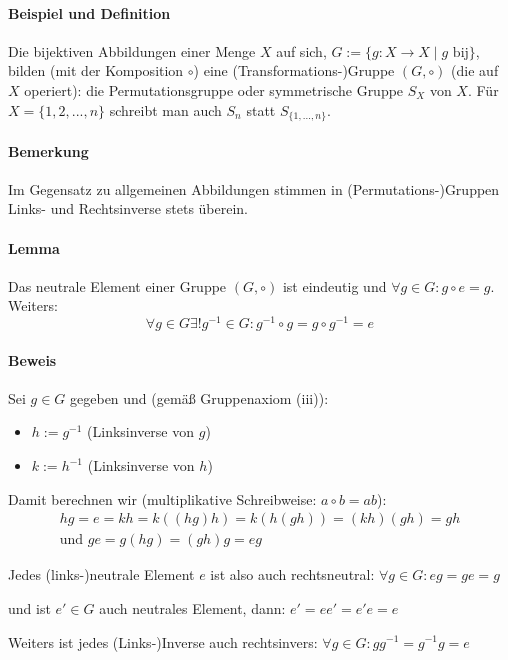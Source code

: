 \paragraph{Beispiel und Definition}
	Die bijektiven Abbildungen einer Menge $X$ auf sich, $G:= \{g:X\to X\mid g \text{ bij}\}$, bilden (mit der Komposition $\circ$) eine (Transformations-)Gruppe $(G,\circ )$ (die auf $X$ operiert): die Permutationsgruppe oder symmetrische Gruppe $S_X$ von $X$. Für $X=\{1,2,...,n\}$ schreibt man auch $S_n$ statt $S_{\{1,...,n\}}$.
\paragraph{Bemerkung}
	Im Gegensatz zu allgemeinen Abbildungen stimmen in (Permutations-)Gruppen Links- und Rechtsinverse stets überein.
\paragraph{Lemma}
	Das neutrale Element einer Gruppe $(G,\circ )$ ist eindeutig und $\forall g\in G: g\circ e = g$. Weiters: 
	\begin{equation*}
		\forall g\in G \exists ! g^{-1} \in G: g^{-1}\circ g = g \circ g^{-1} = e
	\end{equation*}

\paragraph{Beweis}
	Sei $g\in G$ gegeben und (gemäß Gruppenaxiom (iii)):
	\begin{itemize}
		\item $h:= g^{-1}$ (Linksinverse von $g$)
		\item $k:= h^{-1}$ (Linksinverse von $h$)
	\end{itemize}
	
	Damit berechnen wir (multiplikative Schreibweise: $a\circ b = ab$):
	\begin{gather*}
		hg = e = kh = k((hg)h) = k(h(gh)) = (kh)(gh) = gh\\
	\text{und }	ge = g(hg) = (gh)g = eg
	\end{gather*}
	
	Jedes (links-)neutrale Element $e$ ist also auch rechtsneutral:\hfill
	$\forall g\in G: eg = ge = g$
	
	und ist $e'\in G$ auch neutrales Element, dann:\hfill
	$ e' = ee' = e'e = e $

	Weiters ist jedes (Links-)Inverse auch rechtsinvers:\hfill
	$ \forall g \in G: gg^{-1}=g^{-1}g = e $

